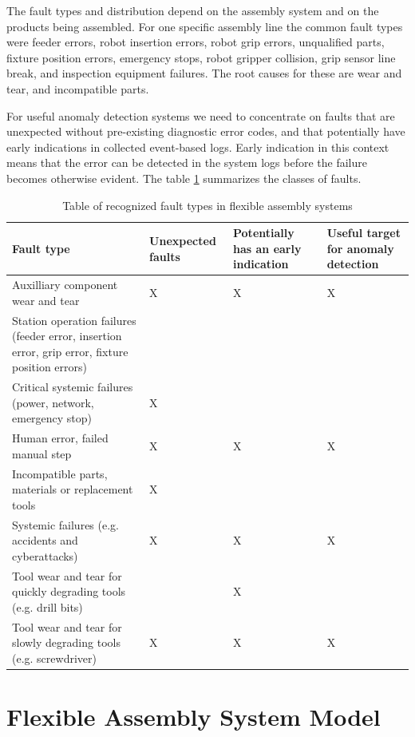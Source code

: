 \documentclass[procedia]{easychair}
\begin{document}
The fault types and distribution depend on the assembly system
and on the products being assembled. For one
specific assembly line \cite{cong1997fault} the common fault types were feeder errors, robot insertion errors,
robot grip errors, unqualified parts, fixture position errors, emergency stops, robot gripper collision,
grip sensor line break, and inspection equipment failures. The root causes for these are wear and tear, and incompatible parts.

For useful anomaly detection systems we need to concentrate on faults that are unexpected without pre-existing diagnostic error codes, and that potentially have early indications
in collected event-based logs. Early indication in this context means that the error can be detected in the system logs before the failure becomes otherwise evident.
The table \ref{faults} summarizes the classes of faults.

\begin{table}[!t]
\tiny
\renewcommand{\arraystretch}{1.3}
\caption{Table of recognized fault types in flexible assembly systems}
\label{faults}
\centering
\begin{tabular}{|p{50mm}|p{25mm}|p{25mm}|p{25mm}|}
\hline
Fault type & Unexpected faults & Potentially has an early indication & Useful target for anomaly detection \\
\hline
\hline
Auxilliary component wear and tear & X & X & X \\
\hline
Station operation failures (feeder error, insertion error, grip error, fixture position errors) & & & \\
\hline
Critical systemic failures (power, network, emergency stop) & X & & \\
\hline
Human error, failed manual step & X & X & X \\
\hline
Incompatible parts, materials or replacement tools & X & & \\
\hline
Systemic failures (e.g. accidents and cyberattacks) & X & X & X \\
\hline
Tool wear and tear for quickly degrading tools (e.g. drill bits) & & X & \\
\hline
Tool wear and tear for slowly degrading tools (e.g. screwdriver) & X & X & X \\
\hline
\end{tabular}
\end{table}

\section{Flexible Assembly System Model}
\end{document}
